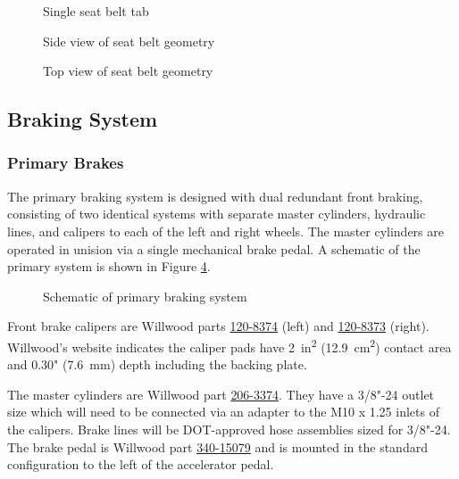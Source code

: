 \documentclass[10pt]{article}
\begin{document}
\begin{figure}
\centering
\caption{Single seat belt tab}
\label{fig:seat-belt-tab}
\end{figure}

\begin{figure}
\centering
\caption{Side view of seat belt geometry}
\label{fig:seat-belt-side-view}
\end{figure}

\begin{figure}
\centering
\caption{Top view of seat belt geometry}
\label{fig:seat-belt-top-view}
\end{figure}

\subsection{Braking System}
\subsubsection{Primary Brakes}
The primary braking system is designed with dual redundant front braking, consisting of two identical systems with separate master cylinders, hydraulic lines, and calipers to each of the left and right wheels. The master cylinders are operated in unision via a single mechanical brake pedal. A schematic of the primary system is shown in Figure \ref{fig:primary-brakes-schematic}.

\begin{figure}
\centering
\caption{Schematic of primary braking system}
\label{fig:primary-brakes-schematic}
\end{figure}

Front brake calipers are Willwood parts \href{http://www.wilwood.com/Calipers/CaliperProd.aspx?itemno=120-8374}{120-8374} (left) and \href{http://www.wilwood.com/Calipers/CaliperProd.aspx?itemno=120-8373}{120-8373} (right). Willwood's website indicates the caliper pads have \SI{2}{in\squared} (\SI{12.9}{\centi\metre\squared}) contact area and 0.30" (\SI{7.6}{\milli\metre}) depth including the backing plate.

The master cylinders are Willwood part \href{http://www.wilwood.com/MasterCylinders/MasterCylinderProd.aspx?itemno=260-3374}{206-3374}. They have a 3/8"-24 outlet size which will need to be connected via an adapter to the M10 x 1.25 inlets of the calipers. Brake lines will be DOT-approved hose assemblies sized for 3/8"-24. The brake pedal is Willwood part \href{http://www.wilwood.com/Pedals/PedalProd.aspx?itemno=340-15079}{340-15079} and is mounted in the standard configuration to the left of the accelerator pedal.
\end{document}
